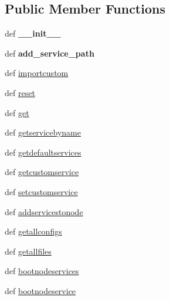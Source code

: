 \subsection*{Public Member Functions}
\begin{DoxyCompactItemize}
\item 
\hypertarget{classcore_1_1service_1_1_core_services_a16e2252a006bb92f5968d73963cbba8e}{def {\bfseries \+\_\+\+\_\+init\+\_\+\+\_\+}}\label{classcore_1_1service_1_1_core_services_a16e2252a006bb92f5968d73963cbba8e}

\item 
\hypertarget{classcore_1_1service_1_1_core_services_a9c799a2a8c36458dfb7229be8ff4cab8}{def {\bfseries add\+\_\+service\+\_\+path}}\label{classcore_1_1service_1_1_core_services_a9c799a2a8c36458dfb7229be8ff4cab8}

\item 
def \hyperlink{classcore_1_1service_1_1_core_services_a351508a0b9999d9ed8a4be365f740d67}{importcustom}
\item 
def \hyperlink{classcore_1_1service_1_1_core_services_a6a59a29993af7c4c68eb14819f1ec996}{reset}
\item 
def \hyperlink{classcore_1_1service_1_1_core_services_afa1ee6a7ed1030cae8c86d77b9c110c6}{get}
\item 
def \hyperlink{classcore_1_1service_1_1_core_services_a36229b43301d28e8d8247be49172f0f6}{getservicebyname}
\item 
def \hyperlink{classcore_1_1service_1_1_core_services_a09c5842d179d3d9def046ca759173d72}{getdefaultservices}
\item 
def \hyperlink{classcore_1_1service_1_1_core_services_ae96482b56e731614b8ff7712dd01d248}{getcustomservice}
\item 
def \hyperlink{classcore_1_1service_1_1_core_services_a8b308c146f084d7793c8431fd48e1021}{setcustomservice}
\item 
def \hyperlink{classcore_1_1service_1_1_core_services_ab9f2a5e0e83d649d267ce8b90a857316}{addservicestonode}
\item 
def \hyperlink{classcore_1_1service_1_1_core_services_acee8f6fa6c0c0ea0953ceae71836eacf}{getallconfigs}
\item 
def \hyperlink{classcore_1_1service_1_1_core_services_af7951c4564f6b28494cea9a58e7e74d5}{getallfiles}
\item 
def \hyperlink{classcore_1_1service_1_1_core_services_ae798dd5e3f078ecb36fa2c17c0738302}{bootnodeservices}
\item 
def \hyperlink{classcore_1_1service_1_1_core_services_a2953efa93f04d9734ae218d2eeeb2a89}{bootnodeservice}

\end{DoxyCompactItemize}
